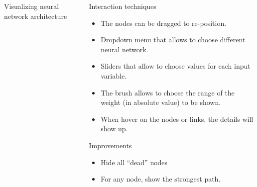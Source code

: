 \documentclass[final,hyperref={pdfpagelabels=false}]{beamer}
\begin{document}
\begin{frame}{}
\begin{columns}[t]
\begin{column}{.4\linewidth}
\begin{block}{Visualizing neural network architecture}
\begin{center}
      \end{center}
      \vspace{3cm}
      \end{block}
      \end{column}
\begin{column}{.25\linewidth}
\begin{block}{Interaction techniques}
\begin{itemize}
\item The nodes can be dragged to re-position.
\item Dropdown menu that allows to choose different neural network.
\item Sliders that allow to choose values for each input variable.
\item The brush allows to choose the range of the weight (in absolute value) to be shown.
\item When hover on the nodes or links, the details will show up.
\end{itemize}
\end{block}    
\begin{block}{Improvements}
\begin{itemize}
\item Hide all ``dead'' nodes
\item For any node, show the strongest path.
\end{itemize}
\end{block}   

      
      \end{column}

      
    \end{columns}
  \end{frame}
\end{document}
